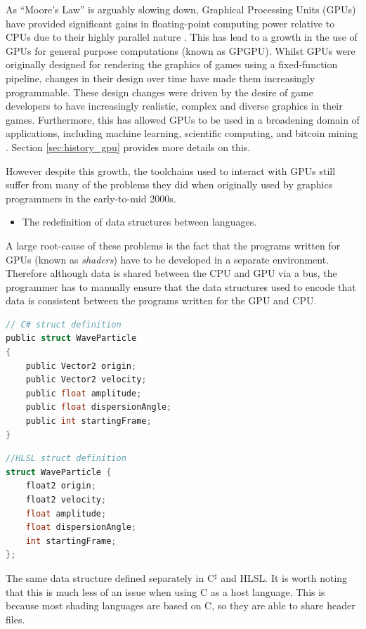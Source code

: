 \documentclass[a4paper,12pt,twoside,openright]{report}
\begin{document}
As ``Moore's Law'' is arguably slowing down, Graphical Processing Units (GPUs)
have provided significant gains in floating-point computing power relative to
CPUs due to their highly parallel nature \cite{MooreLawSlowdown}
\cite{CPUGPUOverTime}. This has lead to a growth in the use of GPUs for general
purpose computations (known as GPGPU). Whilst GPUs were originally designed for
rendering the graphics of games using a fixed-function pipeline, changes in
their design over time have made them increasingly programmable. These design
changes were driven by the desire of game developers to have increasingly
realistic, complex and diverse graphics in their games. Furthermore, this has
allowed GPUs to be used in a broadening domain of applications, including
machine learning, scientific computing, and bitcoin mining \cite{GPUCrypto}
\cite{GPUScientificComputing} \cite{GPUAI}. Section \ref{sec:history_gpu}
provides more details on this.

However despite this growth, the toolchains used to interact with GPUs still
suffer from many of the problems they did when originally used by graphics
programmers in the early-to-mid 2000s.

\begin{itemize}

    \item The redefinition of data structures between languages.

\end{itemize}

A large root-cause of these problems is the fact that the programs written for
GPUs (known as \textit{shaders}) have to be developed in a separate
environment. Therefore although data is shared between the CPU and GPU via a
bus, the programmer has to manually ensure that the data structures used to
encode that data is consistent between the programs written for the GPU and
CPU.

\begin{lstfloat}
\begin{lstlisting}[language=C]
// C# struct definition
public struct WaveParticle
{
    public Vector2 origin;
    public Vector2 velocity;
    public float amplitude;
    public float dispersionAngle;
    public int startingFrame;
}
\end{lstlisting}
\begin{lstlisting}[language=C]
//HLSL struct definition
struct WaveParticle {
    float2 origin;
    float2 velocity;
    float amplitude;
    float dispersionAngle;
    int startingFrame;
};
\end{lstlisting}
\caption{The same data structure defined separately in C$^\sharp$ and HLSL. It
is worth noting that this is much less of an issue when using C as a host
language. This is because most shading languages are based on C, so they are
able to share header files.}
\label{lst:c_sharp_hlsl_struct_comparison}
\end{lstfloat}
\end{document}
